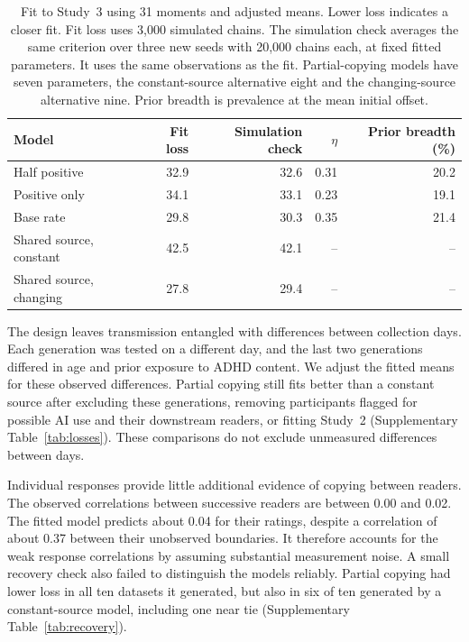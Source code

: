 \documentclass[11pt]{article}
\begin{document}
\begin{table}[htbp]
\centering
\caption{Fit to Study~3 using 31 moments and adjusted means. Lower loss indicates a closer fit. Fit loss uses 3,000 simulated chains. The simulation check averages the same criterion over three new seeds with 20,000 chains each, at fixed fitted parameters. It uses the same observations as the fit. Partial-copying models have seven parameters, the constant-source alternative eight and the changing-source alternative nine. Prior breadth is prevalence at the mean initial offset.}
\label{tab:fit}
\begingroup\small\setlength{\tabcolsep}{5pt}
\begin{tabular}{lrrrr}
\toprule
Model & Fit loss & Simulation check & $\eta$ & Prior breadth (\%) \\
\midrule
Half positive & 32.9 & 32.6 & 0.31 & 20.2 \\
Positive only & 34.1 & 33.1 & 0.23 & 19.1 \\
Base rate & 29.8 & 30.3 & 0.35 & 21.4 \\
Shared source, constant & 42.5 & 42.1 & -- & -- \\
Shared source, changing & 27.8 & 29.4 & -- & -- \\
\bottomrule
\end{tabular}\endgroup
\end{table}

The design leaves transmission entangled with differences between collection days. Each generation was tested on a different day, and the last two generations differed in age and prior exposure to ADHD content. We adjust the fitted means for these observed differences. Partial copying still fits better than a constant source after excluding these generations, removing participants flagged for possible AI use and their downstream readers, or fitting Study~2 (Supplementary Table~\ref{tab:losses}). These comparisons do not exclude unmeasured differences between days.

Individual responses provide little additional evidence of copying between readers. The observed correlations between successive readers are between 0.00 and 0.02. The fitted model predicts about 0.04 for their ratings, despite a correlation of about 0.37 between their unobserved boundaries. It therefore accounts for the weak response correlations by assuming substantial measurement noise. A small recovery check also failed to distinguish the models reliably. Partial copying had lower loss in all ten datasets it generated, but also in six of ten generated by a constant-source model, including one near tie (Supplementary Table~\ref{tab:recovery}).
\end{document}
